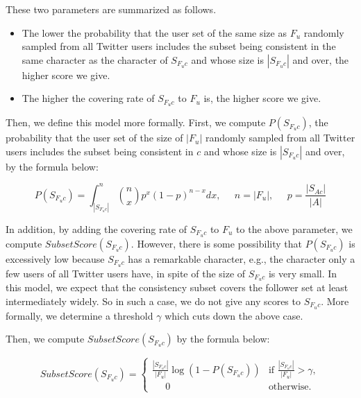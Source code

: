 These two parameters are summarized as follows.
\begin{itemize}
\item The lower the probability that the user set of the same size as $F_u$
randomly sampled from all Twitter users includes the subset
being consistent in the same character as the character of $S_{F_uc}$
and whose size is $|S_{F_uc}|$ and over, the higher score we give.
\item The higher the covering rate of $S_{F_uc}$ to $F_u$ is, the higher
      score we give.
\end{itemize}

Then, we define this model more formally.  First, we compute
$P(S_{F_uc})$, the probability that the user set of the size of $|F_u|$
randomly sampled from all Twitter users includes the subset
being consistent in $c$ and whose size is $|S_{F_uc}|$ and over, by the
formula below:

\vspace{-1ex}
\[
 P(S_{F_uc}) = \int_{|S_{F_uc}|}^{n} \binom{n}{x} p^x (1-p)^{n - x}
 dx,\;\;\;\;\;n = |F_u|,\;\;\;\;\;p = \frac{|S_{Ac}|}{|A|}
\]
\vspace{-2ex}


In addition, by adding the covering rate of $S_{F_uc}$ to $F_u$ to the
above parameter, we compute $\mathit{SubsetScore(S_{F_uc})}$.  However,
there is some possibility that $P(S_{F_uc})$ is excessively low because
$S_{F_uc}$ has a remarkable character, e.g., the character only a few
users of all Twitter users have, in spite of the size of $S_{F_uc}$ is very
small.  In this model, we expect that the consistency subset covers the
follower set at least intermediately widely.  So in such a case, we do
not give any scores to $S_{F_uc}$.  More formally, we determine a
threshold $\gamma$ which cuts down the above case.

Then, we compute $\mathit{SubsetScore(S_{F_uc})}$ by the formula below:

\vspace{-1ex}
\[
  \displaystyle \mathit{SubsetScore}(S_{F_uc}) = \begin{cases}
    \displaystyle \frac{|S_{F_uc}|}{|F_u|} \log (1 - P(S_{F_uc})) &
    \mbox{if } \displaystyle \frac{|S_{F_uc}|}{|F_u|} > \gamma, \\
    \displaystyle \;\;\;\;\;0 & \mbox{otherwise.}
  \end{cases}
\]
\vspace{-2ex}

